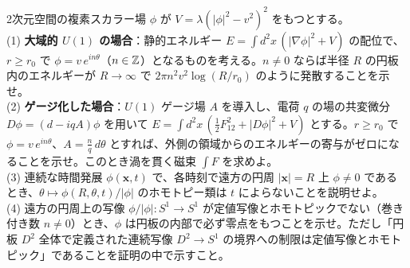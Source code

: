 \begin{problem}[難易度 D]\label{ch01-prob-vortex}
2次元空間の複素スカラー場 $\phi$ が $V=\lambda(\lvert\phi\rvert^2-v^2)^2$ をもつとする。\\
(1) \textbf{大域的 $U(1)$ の場合}：静的エネルギー $E=\int d^2x\,(\lvert\nabla\phi\rvert^2+V)$ の配位で、$r\ge r_0$ で $\phi=v\,e^{in\theta}$（$n\in\mathbb{Z}$）となるものを考える。$n\neq0$ ならば半径 $R$ の円板内のエネルギーが $R\to\infty$ で $2\pi n^2v^2\log(R/r_0)$ のように発散することを示せ。\\
(2) \textbf{ゲージ化した場合}：$U(1)$ ゲージ場 $A$ を導入し、電荷 $q$ の場の共変微分 $D\phi=(d-iqA)\phi$ を用いて $E=\int d^2x\,(\tfrac12F_{12}^2+\lvert D\phi\rvert^2+V)$ とする。$r\ge r_0$ で $\phi=v\,e^{in\theta}$、$A=\tfrac nq\,d\theta$ とすれば、外側の領域からのエネルギーの寄与がゼロになることを示せ。このとき渦を貫く磁束 $\int F$ を求めよ。\\
(3) 連続な時間発展 $\phi(\bm x,t)$ で、各時刻で遠方の円周 $\lvert\bm x\rvert=R$ 上 $\phi\neq0$ であるとき、$\theta\mapsto\phi(R,\theta,t)/\lvert\phi\rvert$ のホモトピー類は $t$ によらないことを説明せよ。\\
(4) 遠方の円周上の写像 $\phi/\lvert\phi\rvert\colon S^1\to S^1$ が定値写像とホモトピックでない（巻き付き数 $n\neq0$）とき、$\phi$ は円板の内部で必ず零点をもつことを示せ。ただし「円板 $D^2$ 全体で定義された連続写像 $D^2\to S^1$ の境界への制限は定値写像とホモトピック」であることを証明の中で示すこと。
\end{problem}

